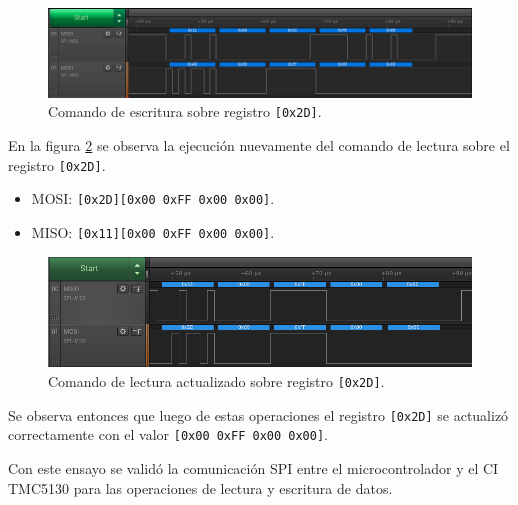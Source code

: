 \begin{figure}[h!]
\centering 
\includegraphics[width=1\textwidth]{./Figures/ensayo_spi_b.png}
\caption{Comando de escritura sobre registro \texttt{[0x2D]}.}
\label{fig:ensayo_spi_b}
\end{figure}

En la figura \ref{fig:ensayo_spi_c} se observa la ejecución nuevamente del comando de lectura sobre el registro \texttt{[0x2D]}.

\begin{itemize}
\item MOSI: \texttt{[0x2D][0x00 0xFF 0x00 0x00]}.
\item MISO: \texttt{[0x11][0x00 0xFF 0x00 0x00]}.
\end{itemize}


\begin{figure}[h!]
\centering 
\includegraphics[width=1\textwidth]{./Figures/ensayo_spi_c_c.png}
\caption{Comando de lectura actualizado sobre registro \texttt{[0x2D]}.}
\label{fig:ensayo_spi_c}
\end{figure}

Se observa entonces que luego de estas operaciones el registro \texttt{[0x2D]} se actualizó correctamente con el valor \texttt{[0x00 0xFF 0x00 0x00]}.

Con este ensayo se validó la comunicación SPI entre el microcontrolador y el CI TMC5130 para las operaciones de lectura y escritura de datos.




